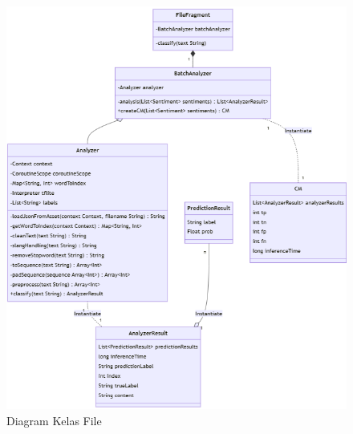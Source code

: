 \begin{figure}[H]
  \centering
  \includegraphics[width=\textwidth]{assets/class_diagram_file.png}
  \caption{Diagram Kelas File}
  \label{fig:class_diagram_file}
\end{figure}

